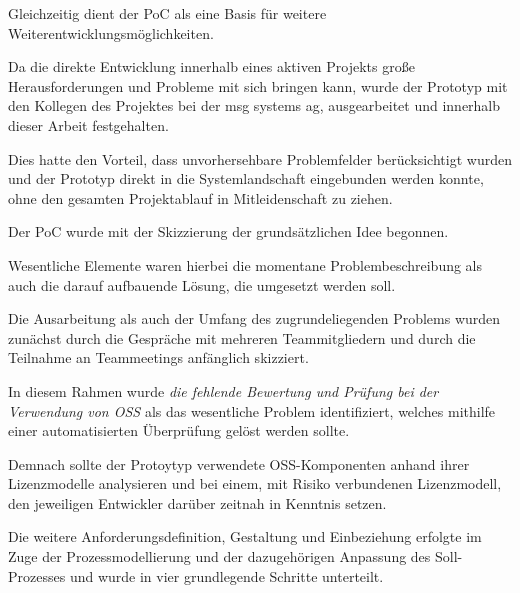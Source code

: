 Gleichzeitig dient der PoC als eine Basis für weitere Weiterentwicklungsmöglichkeiten. 

Da die direkte Entwicklung innerhalb eines aktiven Projekts große Herausforderungen und Probleme mit sich bringen kann, wurde der Prototyp mit den Kollegen des Projektes bei der msg systems ag, ausgearbeitet und innerhalb dieser Arbeit festgehalten. 

Dies hatte den Vorteil, dass unvorhersehbare Problemfelder berücksichtigt wurden und der Prototyp direkt in die Systemlandschaft eingebunden werden konnte, ohne den gesamten Projektablauf in Mitleidenschaft zu ziehen.

Der PoC wurde mit der Skizzierung der grundsätzlichen Idee begonnen. 

Wesentliche Elemente waren hierbei die momentane Problembeschreibung als auch die darauf aufbauende Lösung, die umgesetzt werden soll. 

Die Ausarbeitung als auch der Umfang des zugrundeliegenden Problems wurden zunächst durch die Gespräche mit mehreren Teammitgliedern und durch die Teilnahme an Teammeetings anfänglich skizziert.

In diesem Rahmen wurde \textit{die fehlende Bewertung und Prüfung bei der Verwendung von OSS} als das wesentliche Problem identifiziert, welches mithilfe einer automatisierten Überprüfung gelöst werden sollte.

Demnach sollte der Protoytyp verwendete OSS-Komponenten anhand ihrer Lizenzmodelle analysieren und bei einem, mit Risiko verbundenen Lizenzmodell, den jeweiligen Entwickler darüber zeitnah in Kenntnis setzen.  

Die weitere Anforderungsdefinition, Gestaltung und Einbeziehung erfolgte im Zuge der Prozessmodellierung und der dazugehörigen Anpassung des Soll-Prozesses und wurde in vier grundlegende Schritte unterteilt.



